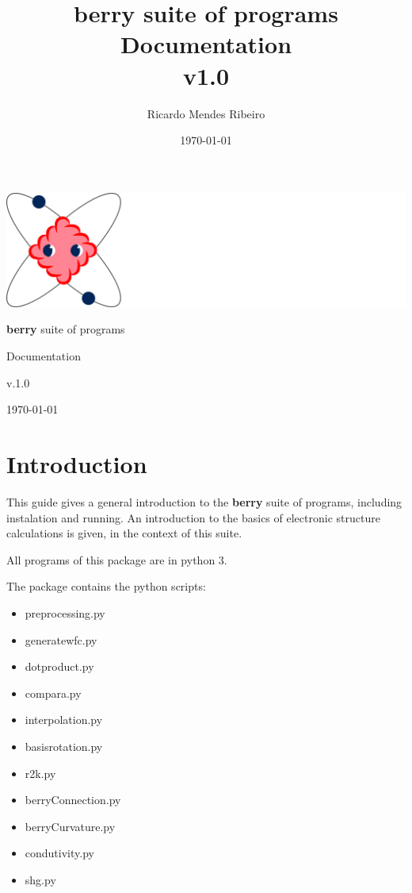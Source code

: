\documentclass[a4paper,12pt]{report}
\title{{\bf berry} suite of programs\\
\large Documentation \\
v1.0}
\author{Ricardo Mendes Ribeiro}
\date{\today}
\begin{document}
\begin{titlepage}
 \begin{center}
 \includegraphics[scale=0.3,keepaspectratio=true]{figures/BerryLogo.png}
\vspace*{2cm}

  \begin{Huge}{\bf berry} suite of programs  \end{Huge}
  \vspace*{1cm}

 \begin{LARGE}Documentation              \end{LARGE}
  \vspace*{1cm}

\begin{Huge}v.1.0\end{Huge}
  \vspace*{0.5cm}

\today

 \end{center}
\end{titlepage}

\tableofcontents

\chapter{Introduction}\label{ch:introduction}

 This guide gives a general introduction to the \textbf{berry} suite of programs, including instalation and running.
 An introduction to the basics of electronic structure calculations is given, in the context of this suite.

 All programs of this package are in python 3.

The package contains the python scripts:
\begin{itemize}
 \item preprocessing.py
 \item generatewfc.py
 \item dotproduct.py
 \item compara.py
 \item interpolation.py
 \item basisrotation.py
 \item r2k.py
 \item berryConnection.py
 \item berryCurvature.py
 \item condutivity.py
 \item shg.py
\end{itemize}\medskip
\end{document}
